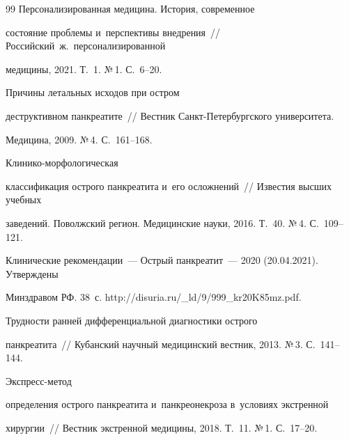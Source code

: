 {{\begin{thebibliography}{99}
 Персонализированная медицина. История, современное 

состояние проблемы и~перспективы внедрения~/\!\!/ Российский~ж.\ персонализированной 

медицины, 2021. Т.~1. №\,1. С.~6--20.




 Причины летальных исходов при остром 

деструктивном панкреатите~/\!\!/ Вестник Санкт-Пе\-тер\-бург\-ско\-го университета. 

Медицина, 2009. №\,4. С.~161--168.




 Кли\-ни\-ко-мор\-фо\-ло\-ги\-че\-ская 

классификация острого панкреатита и~его осложнений~/\!\!/ Известия высших учебных 

заведений. Поволжский регион. Медицинские науки, 2016. Т.~40. №\,4. С.~109--121.




Клинические рекомендации~--- Острый панкреатит~--- 2020 (20.04.2021). Утверж\-де\-ны 

Минздравом РФ. 38~с. {\sf http://disuria.ru/\_ld/9/999\_kr20K85mz.pdf.}


 Трудности ранней дифференциальной диагностики острого 

панкреатита~/\!\!/ Кубанский научный медицинский вестник, 2013. №\,3. С.~141--144.


 Экс\-пресс-ме\-тод 

определения острого панкреатита и~панкреонекроза в~условиях экстренной 

хирургии~/\!\!/ Вестник экстренной медицины, 2018. Т.~11. №\,1. С.~17--20.

         \end{thebibliography}

} }







